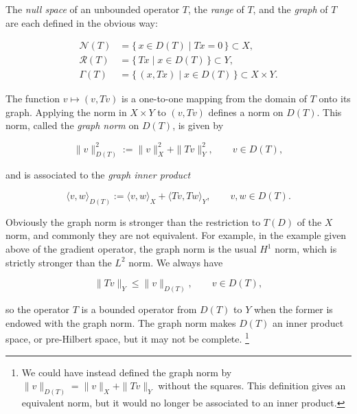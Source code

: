 {The \emph{null space} of an unbounded operator $T$, the \emph{range} of $T$, and the \emph{graph} of $T$ are each defined in the obvious way:}

\[
\begin{aligned}
\mathcal N(T)&=\{\,x\in D(T)\mid Tx=0\,\}\subset X,\\
\mathcal R(T)&=\{\,Tx\mid x\in D(T)\,\}\subset Y,\\
\Gamma(T)&=\{\,(x,Tx)\mid x\in D(T)\,\}\subset X\times Y.
\end{aligned}
\]

{The function $v\mapsto(v,Tv)$ is a one-to-one mapping from the domain of $T$ onto its graph. Applying the norm in $X\times Y$ to $(v,Tv)$ defines a norm on $D(T)$. This norm, called the \emph{graph norm} on $D(T)$, is given by}

\[
\|v\|_{D(T)}^2:=\|v\|_X^2+\|Tv\|_Y^2,\qquad v\in D(T),
\]

{and is associated to the \emph{graph inner product}}

\[
\langle v,w\rangle_{D(T)}:=\langle v,w\rangle_X+\langle Tv,Tw\rangle_Y,\qquad v,w\in D(T).
\]

{Obviously the graph norm is stronger than the restriction to $T(D)$ of the $X$ norm, and commonly they are not equivalent. For example, in the example given above of the gradient operator, the graph norm is the usual $H^1$ norm, which is strictly stronger than the $L^2$ norm. We always have}

\[
\|Tv\|_Y\leq\|v\|_{D(T)},\qquad v\in D(T),
\]

{so the operator $T$ is a bounded operator from $D(T)$ to $Y$ when the former is endowed with the graph norm. The graph norm makes $D(T)$ an inner product space, or pre-Hilbert space, but it may not be complete.}%
\footnote{{We could have instead defined the graph norm by $\|v\|_{D(T)}=\|v\|_X+\|Tv\|_Y$ without the squares. This definition gives an equivalent norm, but it would no longer be associated to an inner product.}}
